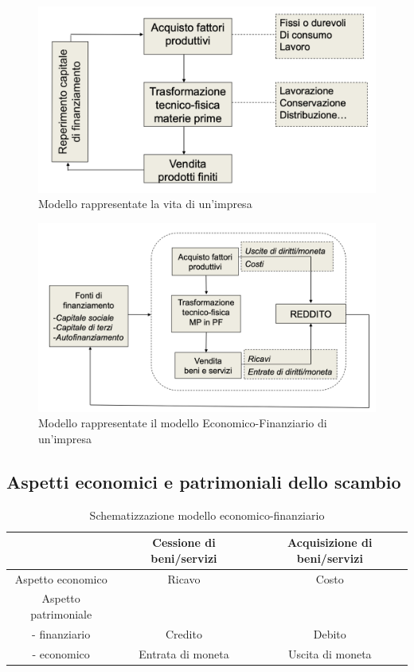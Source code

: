 \begin{center}

\begin{figure}[H]
	\includegraphics[width=0.8\linewidth]{resources/chapters/Bilancio/images/vita-impresa.png}
	\centering
	\caption{Modello rappresentate la vita di un'impresa}
\end{figure}

\begin{figure}[H]
	\includegraphics[width=0.8\linewidth]{resources/chapters/Bilancio/images/modello-economico-finanziario.png}
	\centering
	\caption{Modello rappresentate il modello Economico-Finanziario di un'impresa}
\end{figure}
\end{center}


\subsection{Aspetti economici e patrimoniali dello scambio}
\begin{table}[h!]
	\begin{tabular}{|c | c | c|}
		\hline
		& Cessione di beni/servizi & Acquisizione di beni/servizi \\
		\hline
		Aspetto economico & Ricavo & Costo \\
		\hline
		Aspetto patrimoniale & & \\
		- finanziario & Credito & Debito \\
		- economico & Entrata di moneta & Uscita di moneta \\
		\hline
	\end{tabular}
	\centering
	\caption{Schematizzazione modello economico-finanziario}
\end{table}

